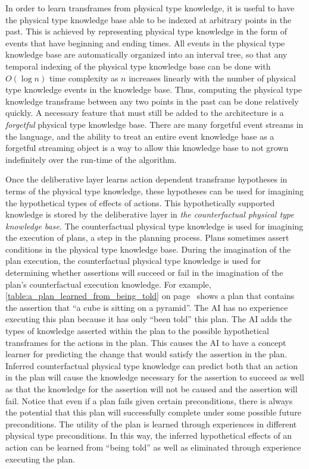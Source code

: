 In order to learn transframes from physical type knowledge, it is
useful to have the physical type knowledge base able to be indexed at
arbitrary points in the past.  This is achieved by representing
physical type knowledge in the form of events that have beginning and
ending times.  All events in the physical type knowledge base are
automatically organized into an interval tree, so that any temporal
indexing of the physical type knowledge base can be done with $O(\log
n)$ time complexity as $n$ increases linearly with the number of
physical type knowledge events in the knowledge base.  Thus, computing
the physical type knowledge transframe between any two points in the
past can be done relatively quickly.  A necessary feature that must
still be added to the architecture is a \emph{forgetful} physical type
knowledge base.  There are many forgetful event streams in the
language, and the ability to treat an entire event knowledge base as a
forgetful streaming object is a way to allow this knowledge base to
not grown indefinitely over the run-time of the algorithm.

Once the deliberative layer learns action dependent transframe
hypotheses in terms of the physical type knowledge, these hypotheses
can be used for imagining the hypothetical types of effects of
actions.  This hypothetically supported knowledge is stored by the
deliberative layer in \emph{the counterfactual physical type knowledge
  base}.  The counterfactual physical type knowledge is used for
imagining the execution of plans, a step in the planning process.
Plans sometimes assert conditions in the physical type knowledge base.
During the imagination of the plan execution, the counterfactual
physical type knowledge is used for determining whether assertions
will succeed or fail in the imagination of the plan's counterfactual
execution knowledge.  For example,
{\mbox{\autoref{table:a_plan_learned_from_being_told}}} on
{\mbox{page~\pageref{table:a_plan_learned_from_being_told}}} shows a
plan that contains the assertion that ``a cube is sitting on a
pyramid''.  The AI has no experience executing this plan because it
has only ``been told'' this plan.  The AI adds the types of knowledge
asserted within the plan to the possible hypothetical transframes for
the actions in the plan.  This causes the AI to have a concept learner
for predicting the change that would satisfy the assertion in the
plan.  Inferred counterfactual physical type knowledge can predict
both that an action in the plan will cause the knowledge necessary for
the assertion to succeed as well as that the knowledge for the
assertion will not be caused and the assertion will fail.  Notice that
even if a plan fails given certain preconditions, there is always the
potential that this plan will successfully complete under some
possible future preconditions.  The utility of the plan is learned
through experiences in different physical type preconditions.  In this
way, the inferred hypothetical effects of an action can be learned
from ``being told'' as well as eliminated through experience executing
the plan.

